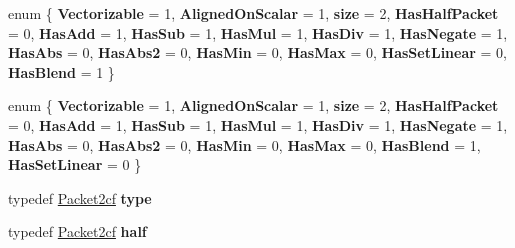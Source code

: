 \begin{DoxyCompactItemize}
enum \{ \newline
{\bfseries Vectorizable} = 1, 
{\bfseries Aligned\+On\+Scalar} = 1, 
{\bfseries size} = 2, 
{\bfseries Has\+Half\+Packet} = 0, 
\newline
{\bfseries Has\+Add} = 1, 
{\bfseries Has\+Sub} = 1, 
{\bfseries Has\+Mul} = 1, 
{\bfseries Has\+Div} = 1, 
\newline
{\bfseries Has\+Negate} = 1, 
{\bfseries Has\+Abs} = 0, 
{\bfseries Has\+Abs2} = 0, 
{\bfseries Has\+Min} = 0, 
\newline
{\bfseries Has\+Max} = 0, 
{\bfseries Has\+Set\+Linear} = 0, 
{\bfseries Has\+Blend} = 1
 \}
\item 
\mbox{\label{struct_eigen_1_1internal_1_1packet__traits_3_01std_1_1complex_3_01float_01_4_01_4_a52eb03598a90bf4eb493b37b0a6949e9}} 
enum \{ \newline
{\bfseries Vectorizable} = 1, 
{\bfseries Aligned\+On\+Scalar} = 1, 
{\bfseries size} = 2, 
{\bfseries Has\+Half\+Packet} = 0, 
\newline
{\bfseries Has\+Add} = 1, 
{\bfseries Has\+Sub} = 1, 
{\bfseries Has\+Mul} = 1, 
{\bfseries Has\+Div} = 1, 
\newline
{\bfseries Has\+Negate} = 1, 
{\bfseries Has\+Abs} = 0, 
{\bfseries Has\+Abs2} = 0, 
{\bfseries Has\+Min} = 0, 
\newline
{\bfseries Has\+Max} = 0, 
{\bfseries Has\+Blend} = 1, 
{\bfseries Has\+Set\+Linear} = 0
 \}
\item 
\mbox{\label{struct_eigen_1_1internal_1_1packet__traits_3_01std_1_1complex_3_01float_01_4_01_4_a580a3908d84d95ba19d0c9bddcb40f6a}} 
typedef \hyperlink{struct_eigen_1_1internal_1_1_packet2cf}{Packet2cf} {\bfseries type}
\item 
\mbox{\label{struct_eigen_1_1internal_1_1packet__traits_3_01std_1_1complex_3_01float_01_4_01_4_a26ca9289181f825939af56a94afc23db}} 
typedef \hyperlink{struct_eigen_1_1internal_1_1_packet2cf}{Packet2cf} {\bfseries half}
\item 
\mbox{\label{struct_eigen_1_1internal_1_1packet__traits_3_01std_1_1complex_3_01float_01_4_01_4_ad9687ac24553844fbd766cdaf21c4ded}} 

\end{DoxyCompactItemize}
